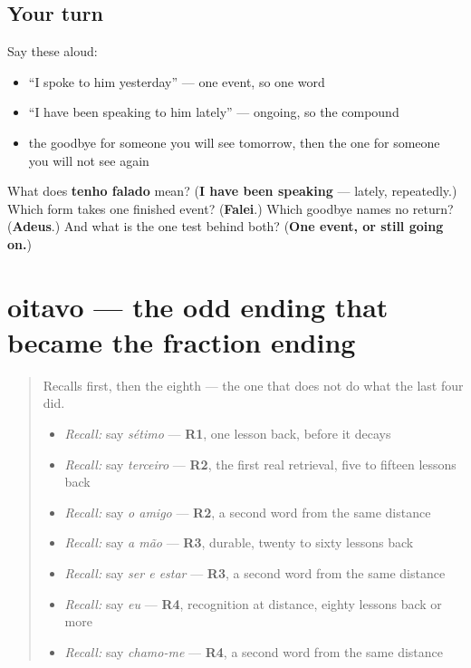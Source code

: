 \subsection*{Your turn}
Say these aloud:

\begin{itemize}
\raggedright
  \item \textquotedblleft{}I spoke to him yesterday\textquotedblright{} — one event, so one word
  \item \textquotedblleft{}I have been speaking to him lately\textquotedblright{} — ongoing, so the compound
  \item the goodbye for someone you will see tomorrow, then the one for someone you will not see again
\end{itemize}

\begin{tcolorbox}[breakable,colback=teal!4,colframe=teal!35!black,title={Before you move on}]
What does \textbf{tenho falado} mean? (\textbf{I have been speaking} — lately, repeatedly.) Which form takes one finished event? (\textbf{Falei}.) Which goodbye names no return? (\textbf{Adeus}.) And what is the one test behind both? (\textbf{One event, or still going on.})
\end{tcolorbox}
\section[oitavo / oitava]{oitavo — the odd ending that became the fraction ending}

\label{lesson:PT-C28-oitavo}



\begin{quote}
Recalls first, then the eighth — the one that does not do what the last four did.

\begin{itemize}
\raggedright
  \item \emph{Recall:} say \emph{sétimo} — \textbf{R1}, one lesson back, before it decays
  \item \emph{Recall:} say \emph{terceiro} — \textbf{R2}, the first real retrieval, five to fifteen lessons back
  \item \emph{Recall:} say \emph{o amigo} — \textbf{R2}, a second word from the same distance
  \item \emph{Recall:} say \emph{a mão} — \textbf{R3}, durable, twenty to sixty lessons back
  \item \emph{Recall:} say \emph{ser e estar} — \textbf{R3}, a second word from the same distance
  \item \emph{Recall:} say \emph{eu} — \textbf{R4}, recognition at distance, eighty lessons back or more
  \item \emph{Recall:} say \emph{chamo-me} — \textbf{R4}, a second word from the same distance
\end{itemize}
\end{quote}

